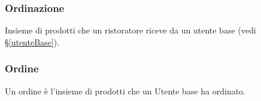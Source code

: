 
\subsubsection*{Ordinazione}
Insieme di prodotti che un ristoratore riceve da un utente base (vedi
\S\ref{utenteBase}).

\subsubsection*{Ordine}
\label{ordine}
Un ordine è l'insieme di prodotti che un Utente base ha ordinato.

\newpage
